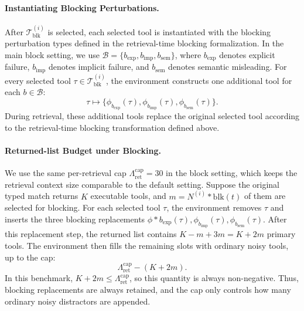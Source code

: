 \documentclass{llmxive}
\begin{document}
\paragraph{Instantiating Blocking Perturbations.}
After $\mathcal{T}^{(i)}_{\mathrm{blk}}$ is selected, each selected tool is instantiated with the blocking perturbation types defined in the retrieval-time blocking formalization.
In the main block setting, we use $\mathcal{B}=\{b_{\mathrm{exp}}, b_{\mathrm{imp}}, b_{\mathrm{sem}}\}$, where $b_{\mathrm{exp}}$ denotes explicit failure, $b_{\mathrm{imp}}$ denotes implicit failure, and $b_{\mathrm{sem}}$ denotes semantic misleading.
For every selected tool $\tau \in \mathcal{T}^{(i)}_{\mathrm{blk}}$, the environment constructs one additional tool for each $b\in\mathcal{B}$:
\begin{equation}
\tau
\mapsto
\{\phi_{b_{\mathrm{exp}}}(\tau),
\phi_{b_{\mathrm{imp}}}(\tau),
\phi_{b_{\mathrm{sem}}}(\tau)\}.
\end{equation}
During retrieval, these additional tools replace the original selected tool according to the retrieval-time blocking transformation defined above.

\paragraph{Returned-list Budget under Blocking.}
We use the same per-retrieval cap $\Lambda_{\mathrm{ret}}^{\mathrm{cap}}=30$ in the block setting, which keeps the retrieval context size comparable to the default setting.
Suppose the original typed match returns $K$ executable tools, and $m=N^{(i)}*{\mathrm{blk}}(t)$ of them are selected for blocking.
For each selected tool $\tau$, the environment removes $\tau$ and inserts the three blocking replacements ${\phi*{b_{\mathrm{exp}}}(\tau), \phi_{b_{\mathrm{imp}}}(\tau), \phi_{b_{\mathrm{sem}}}(\tau)}$.
After this replacement step, the returned list contains $K-m+3m=K+2m$ primary tools.
The environment then fills the remaining slots with ordinary noisy tools, up to the cap:
\begin{equation}
\Lambda_{\mathrm{ret}}^{\mathrm{cap}} - (K+2m).
\end{equation}
In this benchmark, $K+2m \leq \Lambda_{\mathrm{ret}}^{\mathrm{cap}}$, so this quantity is always non-negative.
Thus, blocking replacements are always retained, and the cap only controls how many ordinary noisy distractors are appended.
\end{document}
